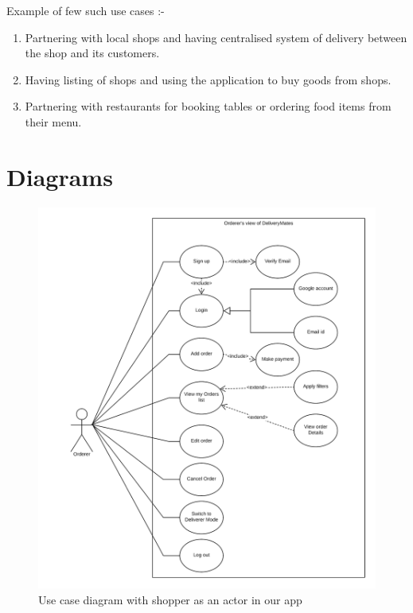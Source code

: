 \documentclass{report}
\begin{document}
Example of few such use cases :-
\begin{enumerate}[label=\alph*.]
\item Partnering with local shops and having centralised system of delivery between the shop and its customers. 
\item Having listing of shops and using the application to buy goods from shops.
\item Partnering with restaurants for booking tables or ordering food items from their menu.
\end{enumerate}

\section{Diagrams}
\begin{figure}[h!]
\includegraphics[width=16cm]{OrdererUseCase.png}
\caption{Use case diagram with shopper as an actor in our app}
\label{fig:NASA_Logo}
\end{figure}
\end{document}

